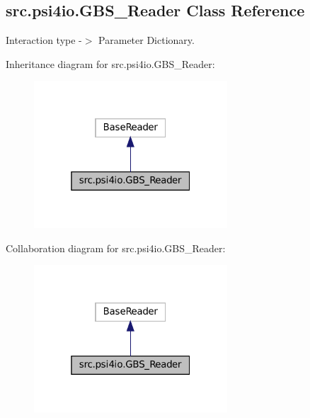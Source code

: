 \hypertarget{classsrc_1_1psi4io_1_1GBS__Reader}{}\subsection{src.\+psi4io.\+G\+B\+S\+\_\+\+Reader Class Reference}
\label{classsrc_1_1psi4io_1_1GBS__Reader}


Interaction type -\/$>$ Parameter Dictionary.  




Inheritance diagram for src.\+psi4io.\+G\+B\+S\+\_\+\+Reader\+:
\nopagebreak
\begin{figure}[H]
\begin{center}
\leavevmode
\includegraphics[width=205pt]{classsrc_1_1psi4io_1_1GBS__Reader__inherit__graph}
\end{center}
\end{figure}


Collaboration diagram for src.\+psi4io.\+G\+B\+S\+\_\+\+Reader\+:
\nopagebreak
\begin{figure}[H]
\begin{center}
\leavevmode
\includegraphics[width=205pt]{classsrc_1_1psi4io_1_1GBS__Reader__coll__graph}
\end{center}
\end{figure}
